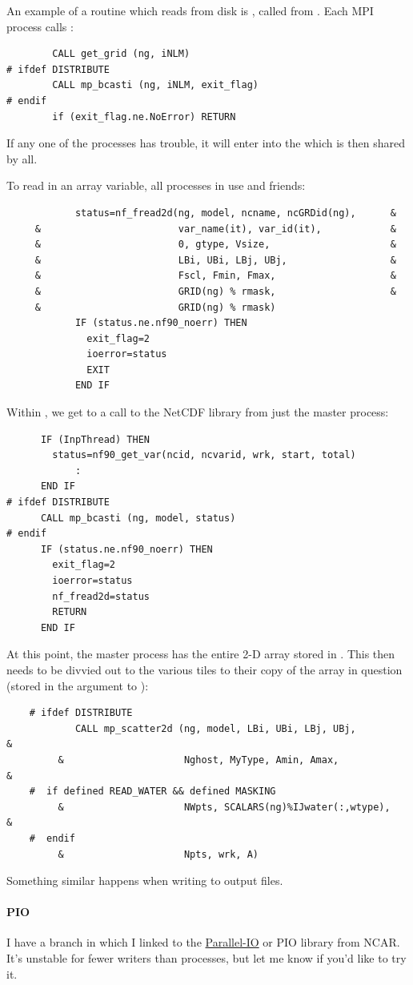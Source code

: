 An example of a routine which reads from disk is ,
called from . Each MPI process calls :
\begin{verbatim}
        CALL get_grid (ng, iNLM)
# ifdef DISTRIBUTE
        CALL mp_bcasti (ng, iNLM, exit_flag)
# endif
        if (exit_flag.ne.NoError) RETURN
\end{verbatim}
If any one of the processes has trouble, it will enter into the
 which is then shared by all.

To read in an array variable, all processes in  use
 and friends:
\begin{verbatim}
            status=nf_fread2d(ng, model, ncname, ncGRDid(ng),      &
     &                        var_name(it), var_id(it),            &
     &                        0, gtype, Vsize,                     &
     &                        LBi, UBi, LBj, UBj,                  &
     &                        Fscl, Fmin, Fmax,                    &
     &                        GRID(ng) % rmask,                    &
     &                        GRID(ng) % rmask)
            IF (status.ne.nf90_noerr) THEN
              exit_flag=2
              ioerror=status
              EXIT
            END IF
\end{verbatim}
Within , we get to a call to the NetCDF library
from just the master process:
\begin{verbatim}
      IF (InpThread) THEN
        status=nf90_get_var(ncid, ncvarid, wrk, start, total)
            :
      END IF
# ifdef DISTRIBUTE
      CALL mp_bcasti (ng, model, status)
# endif
      IF (status.ne.nf90_noerr) THEN
        exit_flag=2
        ioerror=status
        nf_fread2d=status
        RETURN
      END IF
\end{verbatim}
At this point, the master process has the entire 2-D array stored in
. This then needs to be divvied out to the various tiles
to their copy of the array in question (stored in the 
argument to ):
\begin{verbatim}
    # ifdef DISTRIBUTE
            CALL mp_scatter2d (ng, model, LBi, UBi, LBj, UBj,         &
         &                     Nghost, MyType, Amin, Amax,            &
    #  if defined READ_WATER && defined MASKING
         &                     NWpts, SCALARS(ng)%IJwater(:,wtype),   &
    #  endif
         &                     Npts, wrk, A)
\end{verbatim}
Something similar happens when writing to output files.

\paragraph{PIO}
I have a branch in which I linked to the
\href{https://github.com/NCAR/ParallelIO}{Parallel-IO} or PIO library
from NCAR. It's unstable for fewer writers than processes, but let
me know if you'd like to try it.
